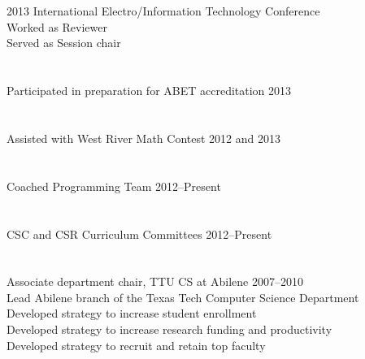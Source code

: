 \documentclass[12pt]{resume}
\begin{document}
\section{}{2013 International Electro/Information Technology
  Conference}
{\\
\hspace*{1em} Worked as Reviewer\\
\hspace*{1em} Served as Session chair\\
}

\vspace*{-1.25\baselineskip}
\section{}{Participated in preparation for ABET accreditation 2013}{}

\vspace*{-1.25\baselineskip}
\section{}{Assisted with West River Math Contest 2012 and 2013}{}

\vspace*{-1.25\baselineskip}
\section{}{Coached Programming Team 2012--Present}{}

\vspace*{-1.25\baselineskip}
\section{}{CSC and CSR Curriculum Committees 2012--Present}{}

\vspace*{-1.25\baselineskip}
\section{}{Associate department chair, TTU CS at Abilene 2007--2010}
{\\
\hspace*{1em} Lead Abilene branch of the Texas Tech Computer Science Department\\
\hspace*{1em} Developed strategy to increase student enrollment\\
\hspace*{1em} Developed strategy to increase research funding and productivity\\
\hspace*{1em} Developed strategy to recruit and retain top faculty\\
}
\end{document}
